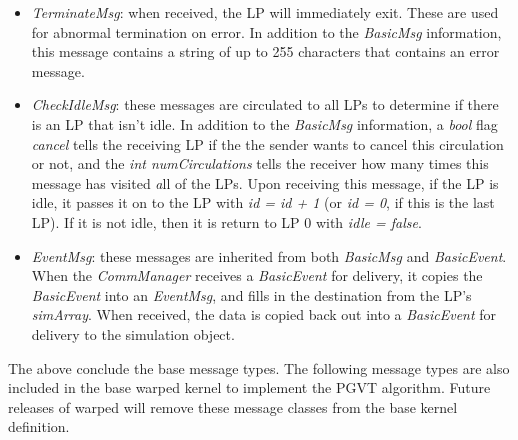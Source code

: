 \documentclass[11pt]{report}
\begin{document}
\begin{itemize}
\item
{\it TerminateMsg}: when received, the LP will immediately exit.  These
are used for abnormal termination on error.  In addition to the
{\it BasicMsg} information, this message contains a string of up to 255
characters that contains an error message.

\item
{\it CheckIdleMsg}: these messages are circulated to all LPs to
determine if there is an LP that isn't idle.  In addition to the {\it 
BasicMsg} information, a {\it bool} flag {\it cancel} tells the
receiving LP if the the sender wants to cancel this circulation or not,
and the {\it int numCirculations} tells the receiver how many times
this message has visited {\emph all} of the LPs.  Upon receiving this
message, if the LP is idle, it passes it on to the LP with {\it  id =
id + 1} (or {\it id = 0}, if this is the last LP).  If it is not idle,
then it is return to LP 0 with {\it idle = false}.

\item
{\it EventMsg}: these messages are inherited from both {\it BasicMsg}
and {\it BasicEvent}.  When the {\it CommManager} receives a {\it 
BasicEvent} for delivery, it copies the {\it BasicEvent} into an {\it 
EventMsg}, and fills in the destination from the LP's {\it simArray}.
When received, the data is copied back out into a {\it BasicEvent} for
delivery to the simulation object.

\end{itemize}

The above conclude the base message types.  The following message types
are also included in the base {\sc warped} kernel to implement the PGVT
algorithm.  Future releases of {\sc warped} will remove these message
classes from the base kernel definition.
\end{document}
